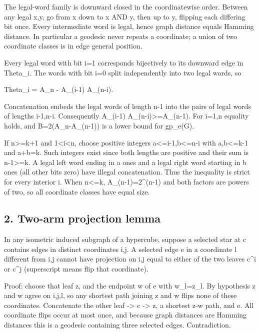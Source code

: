 \documentclass[
  11pt,
]{article}
\begin{document}
The legal-word family is downward closed in the coordinatewise order.
Between any legal x,y, go from x down to x AND y, then up to y, flipping
each differing bit once. Every intermediate word is legal, hence graph
distance equals Hamming distance. In particular a geodesic never repeats
a coordinate; a union of two coordinate classes is in edge general
position.

Every legal word with bit i=1 corresponds bijectively to its downward
edge in Theta\_i. The words with bit i=0 split independently into two
legal words, so

\textbar Theta\_i\textbar{} = A\_n - A\_(i-1) A\_(n-i).

Concatenation embeds the legal words of length n-1 into the pairs of
legal words of lengths i-1,n-i. Consequently A\_(i-1)
A\_(n-i)\textgreater=A\_(n-1). For i=1,n equality holds, and
B=2(A\_n-A\_(n-1)) is a lower bound for gp\_e(G).

If n\textgreater=k+1 and 1\textless i\textless n, choose positive
integers a\textless=i-1,b\textless=n-i with a,b\textless=k-1 and a+b=k.
Such integers exist since both lengths are positive and their sum is
n-1\textgreater=k. A legal left word ending in a ones and a legal right
word starting in b ones (all other bits zero) have illegal
concatenation. Thus the inequality is strict for every interior i. When
n\textless=k, A\_(n-1)=2\^{}(n-1) and both factors are powers of two, so
all coordinate classes have equal size.

\subsection{2. Two-arm projection
lemma}\label{2-two-arm-projection-lemma}

In any isometric induced subgraph of a hypercube, suppose a selected
star at c contains edges in distinct coordinates i,j. A selected edge e
in a coordinate l different from i,j cannot have projection on i,j equal
to either of the two leaves c\^{}i or c\^{}j (superscript means flip
that coordinate).

Proof: choose that leaf z, and the endpoint w of e with w\_l=z\_l. By
hypothesis z and w agree on i,j,l, so any shortest path joining z and w
flips none of these coordinates. Concatenate the other leaf
-\textgreater{} c -\textgreater{} z, a shortest z-w path, and e. All
coordinate flips occur at most once, and because graph distances are
Hamming distances this is a geodesic containing three selected edges.
Contradiction.
\end{document}
